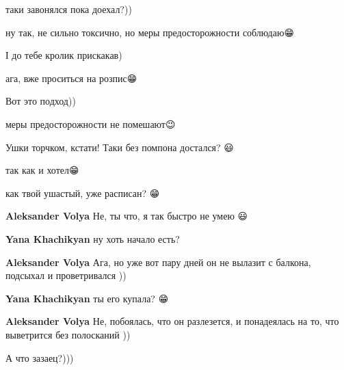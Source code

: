 
таки завонялся пока доехал?))

\begin{itemize} %

ну так, не сильно токсично, но меры предосторожности соблюдаю😁

\end{itemize} %


І до тебе кролик прискакав)

\begin{itemize} %

ага, вже проситься на розпис😁

\end{itemize} %


Вот это подход))

\begin{itemize} %

меры предосторожности не помешают😉
\end{itemize} %


Ушки торчком, кстати! Таки без помпона достался? 😃

\begin{itemize} %

так как и хотел😁🐇


как твой ушастый, уже расписан? 😁

\textbf{Aleksander Volya} Не, ты что, я так быстро не умею 😃

\textbf{Yana Khachikyan} ну хоть начало есть?

\textbf{Aleksander Volya} Ага, но уже вот пару дней он не вылазит с балкона, подсыхал и проветривался ))

\textbf{Yana Khachikyan} ты его купала? 😁

\textbf{Aleksander Volya} Не, побоялась, что он разлезется, и понадеялась на то, что выветрится без полосканий ))
\end{itemize} %


А что зазаец?)))

